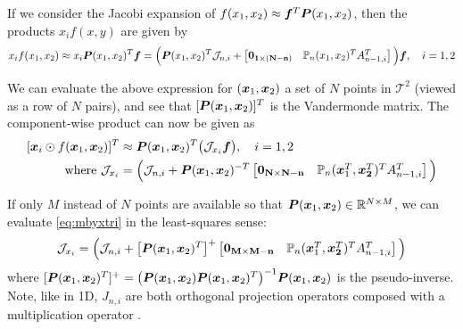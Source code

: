 If we consider the Jacobi expansion of $f(x_1,x_2) \approx \boldsymbol{f}^T\boldsymbol{P}(x_1,x_2)$, then the products $x_if(x,y)$ are given by 
\begin{equation}\label{eq:multbyxi}
	x_if(x_1,x_2) \approx x_i\boldsymbol{P}(x_1,x_2)^T\boldsymbol{f} = \Big(\boldsymbol{P}(x_1,x_2)^T \mathcal{J}_{n,i}+ \begin{bmatrix} \bf{0}_{1\times (N-n)} & \mathbb{P}_n(x_1,x_2)^TA_{n-1,i}^T\end{bmatrix}\Big)\boldsymbol{f},\quad i=1,2
\end{equation}

We can evaluate the above expression for $(\boldsymbol{x}_1,\boldsymbol{x}_2)$ a set of $N$ points in $\mathcal{T}^2$ (viewed as a row of $N$ pairs), and see that $[\boldsymbol{P}(\boldsymbol{x}_1,\boldsymbol{x}_2)]^T$ is the Vandermonde matrix. The component-wise product can now be given as
\begin{equation}\label{eq:mbyxtri}
	\begin{split}
	[\boldsymbol{x}_i\odot f(\boldsymbol{x}_1,\boldsymbol{x}_2)]^T &\approx \boldsymbol{P}(\boldsymbol{x}_1,\boldsymbol{x}_2)^T\big(\mathcal{J}_{x_i} \boldsymbol{f}\big), \quad i = 1,2\\
	\text{ where } \mathcal{J}_{x_i} &= \Big(\mathcal{J}_{n,i} +  \boldsymbol{P}(\boldsymbol{x}_1,\boldsymbol{x}_2)^{-T}\begin{bmatrix} \bf{0}_{N\times N-n} & \mathbb{P}_n(\boldsymbol{x}_1^T,\boldsymbol{x_2}^T)^TA_{n-1,i}^T\end{bmatrix}\Big)
	\end{split}
\end{equation}

If only $M$ instead of $N$ points are  available so that $\boldsymbol{P}(\boldsymbol{x}_1,\boldsymbol{x}_2) \in \mathbb{R}^{N \times M}$, we can evaluate \eqref{eq:mbyxtri} in the least-squares sense:
\begin{equation}\label{eq:lsqmbyxtri}
\mathcal{J}_{x_i} = \Big(\mathcal{J}_{n,i} +  \big[\boldsymbol{P}(\boldsymbol{x}_1,\boldsymbol{x}_2)^T\big]^{+}\begin{bmatrix} \bf{0}_{M\times M-n} & \mathbb{P}_n(\boldsymbol{x}_1^T,\boldsymbol{x_2}^T)^TA_{n-1,i}^T\end{bmatrix}\Big)
\end{equation}
where $[\boldsymbol{P}(\boldsymbol{x}_1,\boldsymbol{x}_2)^T]^{+} = \big(\boldsymbol{P}(\boldsymbol{x}_1,\boldsymbol{x}_2)\boldsymbol{P}(\boldsymbol{x}_1,\boldsymbol{x}_2)^{T}\big)^{-1}\boldsymbol{P}(\boldsymbol{x}_1,\boldsymbol{x}_2)$ is the pseudo-inverse. Note, like in 1D, \color{red} $J_{n,i}$ are both  orthogonal projection operators composed with a multiplication operator \color{black}. 


